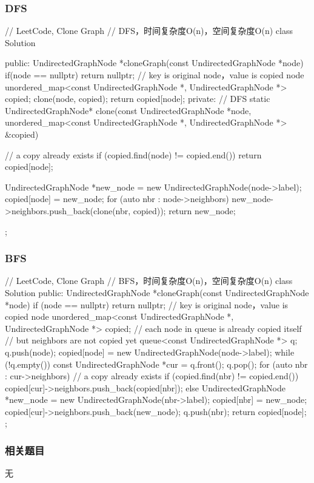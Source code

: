 \subsubsection{DFS}
\begin{Code}
// LeetCode, Clone Graph
// DFS，时间复杂度O(n)，空间复杂度O(n)
class Solution {
public:
    UndirectedGraphNode *cloneGraph(const UndirectedGraphNode *node) {
        if(node == nullptr) return nullptr;
        // key is original node，value is copied node
        unordered_map<const UndirectedGraphNode *,
                            UndirectedGraphNode *> copied;
        clone(node, copied);
        return copied[node];
    }
private:
    // DFS
    static UndirectedGraphNode* clone(const UndirectedGraphNode *node,
            unordered_map<const UndirectedGraphNode *,
            UndirectedGraphNode *> &copied) {
        // a copy already exists
        if (copied.find(node) != copied.end()) return copied[node];

        UndirectedGraphNode *new_node = new UndirectedGraphNode(node->label);
        copied[node] = new_node;
        for (auto nbr : node->neighbors)
            new_node->neighbors.push_back(clone(nbr, copied));
        return new_node;
    }
};
\end{Code}


\subsubsection{BFS}
\begin{Code}
// LeetCode, Clone Graph
// BFS，时间复杂度O(n)，空间复杂度O(n)
class Solution {
public:
    UndirectedGraphNode *cloneGraph(const UndirectedGraphNode *node) {
        if (node == nullptr) return nullptr;
        // key is original node，value is copied node
        unordered_map<const UndirectedGraphNode *,
                            UndirectedGraphNode *> copied;
        // each node in queue is already copied itself
        // but neighbors are not copied yet
        queue<const UndirectedGraphNode *> q;
        q.push(node);
        copied[node] = new UndirectedGraphNode(node->label);
        while (!q.empty()) {
            const UndirectedGraphNode *cur = q.front();
            q.pop();
            for (auto nbr : cur->neighbors) {
                // a copy already exists
                if (copied.find(nbr) != copied.end()) {
                    copied[cur]->neighbors.push_back(copied[nbr]);
                } else {
                    UndirectedGraphNode *new_node =
                            new UndirectedGraphNode(nbr->label);
                    copied[nbr] = new_node;
                    copied[cur]->neighbors.push_back(new_node);
                    q.push(nbr);
                }
            }
        }
        return copied[node];
    }
};
\end{Code}


\subsubsection{相关题目}
\begindot
\item 无
\myenddot
